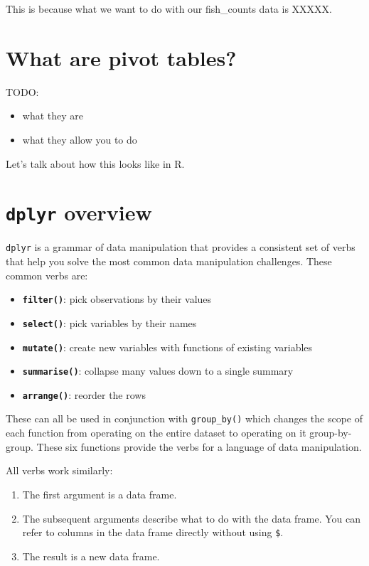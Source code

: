 \documentclass[]{book}
\providecommand{\tightlist}{%
  \setlength{\itemsep}{0pt}\setlength{\parskip}{0pt}}
\begin{document}
This is because what we want to do with our fish\_counts data is XXXXX.

\hypertarget{what-are-pivot-tables}{%
\section{What are pivot tables?}\label{what-are-pivot-tables}}

TODO:

\begin{itemize}
\tightlist
\item
  what they are
\item
  what they allow you to do
\end{itemize}

Let's talk about how this looks like in R.

\hypertarget{dplyr-overview}{%
\section{\texorpdfstring{\texttt{dplyr} overview}{dplyr overview}}\label{dplyr-overview}}

\texttt{dplyr} is a grammar of data manipulation that provides a consistent set of verbs that help you solve the most common data manipulation challenges. These common verbs are:

\begin{itemize}
\item
  \textbf{\texttt{filter()}}: pick observations by their values
\item
  \textbf{\texttt{select()}}: pick variables by their names
\item
  \textbf{\texttt{mutate()}}: create new variables with functions of existing variables
\item
  \textbf{\texttt{summarise()}}: collapse many values down to a single summary
\item
  \textbf{\texttt{arrange()}}: reorder the rows
\end{itemize}

These can all be used in conjunction with \texttt{group\_by()} which changes the scope of each function from operating on the entire dataset to operating on it group-by-group. These six functions provide the verbs for a language of data manipulation.

All verbs work similarly:

\begin{enumerate}
\def\labelenumi{\arabic{enumi}.}
\tightlist
\item
  The first argument is a data frame.
\item
  The subsequent arguments describe what to do with the data frame. You can refer to columns in the data frame directly without using \texttt{\$}.
\item
  The result is a new data frame.
\end{enumerate}
\end{document}
